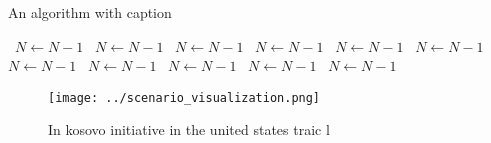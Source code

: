 \documentclass[a4paper]{article}
\begin{document}
\begin{algorithm}
\caption{An algorithm with caption}
\begin{algorithmic}
\    \State $N \gets N - 1$
\    \State $N \gets N - 1$
\    \State $N \gets N - 1$
\    \State $N \gets N - 1$
\    \State $N \gets N - 1$
\    \State $N \gets N - 1$
\    \State $N \gets N - 1$
\    \State $N \gets N - 1$
\    \State $N \gets N - 1$
\    \State $N \gets N - 1$
\    \State $N \gets N - 1$
\EndWhile
\end{algorithmic}
\end{algorithm}

\begin{figure}
\centering
\texttt{[image: ../scenario\_visualization.png]}
\caption{In kosovo initiative in the united states traic l
}
\end{figure}
 
\end{document}
